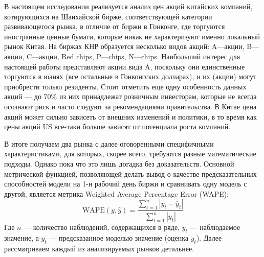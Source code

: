 В настоящем исследовании реализуется анализ цен акций китайских компаний, котирующихся на Шанхайской бирже, соответствующей категории развивающегося рынка, в отличие от биржи в Гонконге, где торгуются иностранные ценные бумаги, которые никак не характеризуют именно локальный рынок Китая. На биржах КНР образуется несколько видов акций: A---акции, B---акции, C---акции, Red chips, P---chips, N---chips. Наибольший интерес для настоящей работы представляют акции вида A, поскольку они единственные торгуются в юанях (все остальные в Гонконгских долларах), и их (акции) могут приобрести только резиденты. Стоит отметить еще одну особенность данных акций --- до $70\%$ из них принадлежат розничным инвесторам, которые не всегда осознают риск и часто следуют за рекомендациями правительства. В Китае цена акций может сильно зависеть от внешних изменений и политики, в то время как цены акций US все-таки больше зависят от потенциала роста компаний.

В итоге получаем два рынка с далее оговоренными специфичными характеристиками, для которых, скорее всего, требуются разные математические подходы. Однако пока что это лишь догадка без доказательств. Основной метрической функцией, позволяющей делать вывод о качестве предсказательных способностей модели на 1-н рабочий день биржи и сравнивать одну модель с другой, является метрика Weighted Average Percentage Error (WAPE):
\begin{equation}
	\text{WAPE}(y, \hat{y}) = \frac{\sum_{t = 1}^n |y_t - \hat{y}_t|}{\sum_{t = 1}^n |y_t|}
\end{equation}
\noindent Где $n$ --- количество наблюдений, содержащихся в ряде, $y_t$ --- наблюдаемое значение, а $\hat{y}_t$ --- предсказанное моделью значение (оценка $y_t$). Далее рассматриваем каждый из анализируемых рынков детальнее.

